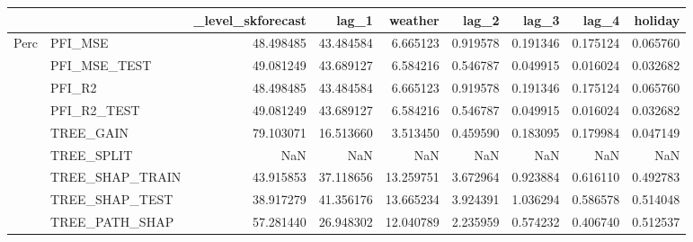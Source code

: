 \begin{tabular}{llrrrrrrr}
\toprule
 &  & _level_skforecast & lag_1 & weather & lag_2 & lag_3 & lag_4 & holiday \\
\midrule
\multirow[t]{9}{*}{Perc} & PFI_MSE & 48.498485 & 43.484584 & 6.665123 & 0.919578 & 0.191346 & 0.175124 & 0.065760 \\
 & PFI_MSE_TEST & 49.081249 & 43.689127 & 6.584216 & 0.546787 & 0.049915 & 0.016024 & 0.032682 \\
 & PFI_R2 & 48.498485 & 43.484584 & 6.665123 & 0.919578 & 0.191346 & 0.175124 & 0.065760 \\
 & PFI_R2_TEST & 49.081249 & 43.689127 & 6.584216 & 0.546787 & 0.049915 & 0.016024 & 0.032682 \\
 & TREE_GAIN & 79.103071 & 16.513660 & 3.513450 & 0.459590 & 0.183095 & 0.179984 & 0.047149 \\
 & TREE_SPLIT & NaN & NaN & NaN & NaN & NaN & NaN & NaN \\
 & TREE_SHAP_TRAIN & 43.915853 & 37.118656 & 13.259751 & 3.672964 & 0.923884 & 0.616110 & 0.492783 \\
 & TREE_SHAP_TEST & 38.917279 & 41.356176 & 13.665234 & 3.924391 & 1.036294 & 0.586578 & 0.514048 \\
 & TREE_PATH_SHAP & 57.281440 & 26.948302 & 12.040789 & 2.235959 & 0.574232 & 0.406740 & 0.512537 \\
\cline{1-9}
\bottomrule
\end{tabular}
